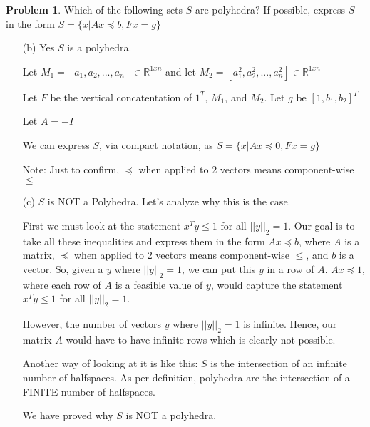 \documentclass{article}
\theoremstyle{definition}
\newtheorem{problem}{Problem}
\begin{document}
\begin{problem}
    Which of the following sets $S$ are polyhedra? If possible, express $S$ in the form $S = \{x | Ax \preceq b, Fx = g \}$
\begin{enumerate}
    \item[(b)]  Yes $S$ is a polyhedra. 

    Let $M_1 = [a_1, a_2, ..., a_n] \in \mathbb{R}^{1 x n}$ and let $M_2 = [a_1^2, a_2^2, ..., a_n^2] \in \mathbb{R}^{1 x n}$

    Let $F$ be the vertical concatentation of $1^T$, $M_1$, and $M_2$. Let $g$ be $[1, b_1, b_2]^T$

    Let $A = -I$
    
    We can express $S$, via compact notation, as $S = \{x | Ax \preceq 0, Fx = g \}$

    Note: Just to confirm, $\preceq$ when applied to 2 vectors means component-wise $\leq$

    \item [(c)] $S$ is NOT a Polyhedra. Let's analyze why this is the case. 

    First we must look at the statement $x^Ty \leq 1$ for all $||y||_2 = 1$. Our goal is to take all these inequalities and express them in the form $Ax \preceq b$, where $A$ is a matrix, $\preceq$ when applied to 2 vectors means component-wise $\leq$, and $b$ is a vector. So, given a $y$ where $||y||_2 = 1$, we can put this $y$ in a row of $A$. $Ax \preceq 1$, where each row of $A$ is a feasible value of $y$, would capture the statement $x^Ty \leq 1$ for all $||y||_2 = 1$. 
    
    However, the number of vectors $y$ where $||y||_2 = 1$ is infinite. Hence, our matrix $A$ would have to have infinite rows which is clearly not possible. 

    Another way of looking at it is like this: \newline 
    $S$ is the intersection of an infinite number of halfspaces. As per definition, polyhedra are the intersection of a FINITE number of halfspaces. 
    
    We have proved why $S$ is NOT a polyhedra.  
\end{enumerate}
\end{problem}
\end{document}
